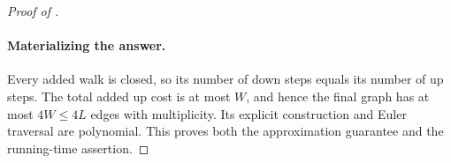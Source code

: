 \begin{proof}[Proof of ]
\paragraph{Materializing the answer.}
Every added walk is closed, so its number of down steps equals its number of up steps. The total added up cost is at most $W$, and hence the final graph has at most $4W\le4L$ edges with multiplicity. Its explicit construction and Euler traversal are polynomial. This proves both the approximation guarantee and the running-time assertion.
\end{proof}

